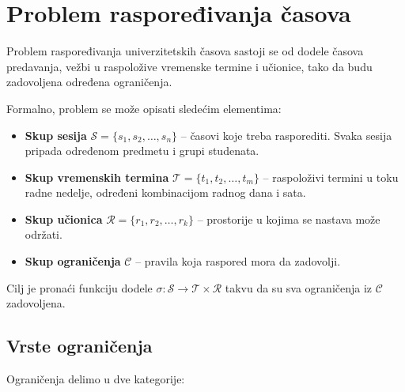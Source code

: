 \documentclass[12pt,oneside]{memoir}
\begin{document}
\section{Problem raspoređivanja časova}
\label{sec:uctp}

Problem raspoređivanja univerzitetskih časova sastoji se od
dodele časova predavanja, vežbi u raspoložive
vremenske termine i učionice, tako da budu zadovoljena određena
ograničenja.

Formalno, problem se može opisati sledećim elementima:

\begin{itemize}
\item \textbf{Skup sesija} $\mathcal{S} = \{s_1, s_2, \ldots, s_n\}$
  -- časovi koje treba rasporediti. Svaka sesija pripada određenom
  predmetu i grupi studenata.

\item \textbf{Skup vremenskih termina} $\mathcal{T} = \{t_1, t_2, \ldots, t_m\}$
  -- raspoloživi termini u toku radne nedelje, određeni kombinacijom
  radnog dana i sata.

\item \textbf{Skup učionica} $\mathcal{R} = \{r_1, r_2, \ldots, r_k\}$
  -- prostorije u kojima se nastava može održati.

\item \textbf{Skup ograničenja} $\mathcal{C}$ -- pravila koja raspored
  mora da zadovolji.
\end{itemize}

Cilj je pronaći funkciju dodele $\sigma : \mathcal{S} \to \mathcal{T}
\times \mathcal{R}$ takvu da su sva ograničenja iz $\mathcal{C}$
zadovoljena.

\subsection{Vrste ograničenja}
\label{subsec:ogranicenja}

Ograničenja delimo u dve kategorije:
\end{document}
